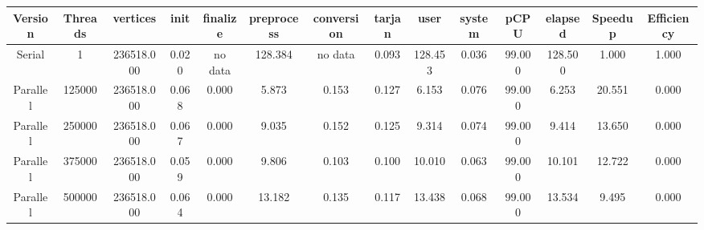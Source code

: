 \begin{tabular}{|c|c|c|c|c|c|c|c|c|c|c|c|c|c|}
\toprule
 Version &  Threads &   vertices &  init & finalize &  preprocess & conversion &  tarjan &    user &  system &   pCPU &  elapsed &  Speedup &  Efficiency \\
\midrule
  Serial &        1 & 236518.000 & 0.020 &  no data &     128.384 &    no data &   0.093 & 128.453 &   0.036 & 99.000 &  128.500 &    1.000 &       1.000 \\
Parallel &   125000 & 236518.000 & 0.068 &    0.000 &       5.873 &      0.153 &   0.127 &   6.153 &   0.076 & 99.000 &    6.253 &   20.551 &       0.000 \\
Parallel &   250000 & 236518.000 & 0.067 &    0.000 &       9.035 &      0.152 &   0.125 &   9.314 &   0.074 & 99.000 &    9.414 &   13.650 &       0.000 \\
Parallel &   375000 & 236518.000 & 0.059 &    0.000 &       9.806 &      0.103 &   0.100 &  10.010 &   0.063 & 99.000 &   10.101 &   12.722 &       0.000 \\
Parallel &   500000 & 236518.000 & 0.064 &    0.000 &      13.182 &      0.135 &   0.117 &  13.438 &   0.068 & 99.000 &   13.534 &    9.495 &       0.000 \\
\bottomrule
\end{tabular}
